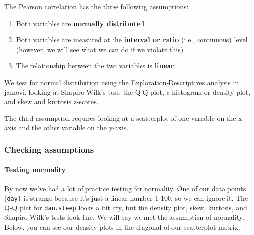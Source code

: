 \documentclass[
]{book}
\begin{document}
The Pearson correlation has the three following assumptions:

\begin{enumerate}
\def\labelenumi{\arabic{enumi}.}
\item
  Both variables are \textbf{normally distributed}
\item
  Both variables are measured at the \textbf{interval or ratio} (i.e., continuous) level (however, we will see what we can do if we violate this)
\item
  The relationship between the two variables is \textbf{linear}
\end{enumerate}

We test for normal distribution using the Exploration-Descriptives analysis in jamovi, looking at Shapiro-Wilk's test, the Q-Q plot, a histogram or density plot, and skew and kurtosis z-scores.

The third assumption requires looking at a scatterplot of one variable on the x-axis and the other variable on the y-axis.

\hypertarget{checking-assumptions-6}{%
\subsubsection{Checking assumptions}\label{checking-assumptions-6}}

\hypertarget{testing-normality-3}{%
\paragraph{Testing normality}\label{testing-normality-3}}

By now we've had a lot of practice testing for normality. One of our data points (\texttt{day)} is strange because it's just a linear number 1-100, so we can ignore it. The Q-Q plot for \texttt{dan.sleep} looks a bit iffy, but the density plot, skew, kurtosis, and Shapiro-Wilk's tests look fine. We will say we met the assumption of normality. Below, you can see our density plots in the diagonal of our scatterplot matrix.
\end{document}
